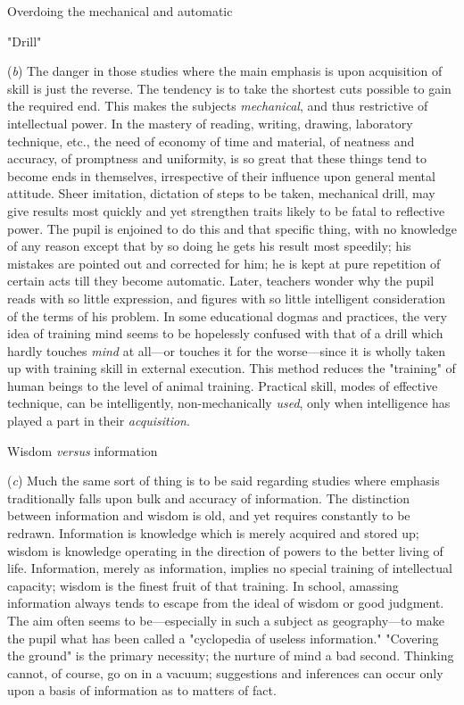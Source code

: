 \documentclass[letterpaper]{book}
\begin{document}
Overdoing the mechanical and automatic

"Drill"

(\emph{b}) The danger in those studies where the main emphasis is upon
acquisition of skill is just the reverse. The tendency is to take the
shortest cuts possible to gain the required end. This makes the subjects
\emph{mechanical}, and thus restrictive of intellectual power. In the
mastery of reading, writing, drawing, laboratory technique, etc., the
need of economy of time and material, of neatness and accuracy, of
promptness and uniformity, is so great that these things tend to become
ends in themselves, irrespective of their influence upon general mental
attitude. Sheer imitation, dictation of steps to be taken, mechanical
drill, may give results most quickly and yet strengthen traits likely to
be fatal to reflective power. The pupil is enjoined to do this and that
specific thing, with no knowledge of any reason except that by so doing
he gets his result most speedily; his mistakes are pointed out and
corrected for him; he is kept at pure repetition of certain acts till
they become automatic. Later, teachers wonder why the pupil reads with
so little expression, and figures with so little intelligent
consideration of the
terms
of his problem. In some educational dogmas and practices, the very idea
of training mind seems to be hopelessly confused with that of a drill
which hardly touches \emph{mind} at all---or touches it for the
worse---since it is wholly taken up with training skill in external
execution. This method reduces the "training" of human beings to the
level of animal training. Practical skill, modes of effective technique,
can be intelligently, non-mechanically \emph{used}, only when
intelligence has played a part in their \emph{acquisition}.

Wisdom \emph{versus} information

(\emph{c}) Much the same sort of thing is to be said regarding studies
where emphasis traditionally falls upon bulk and accuracy of
information. The distinction between information and wisdom is old, and
yet requires constantly to be redrawn. Information is knowledge which is
merely acquired and stored up; wisdom is knowledge operating in the
direction of powers to the better living of life. Information, merely as
information, implies no special training of intellectual capacity;
wisdom is the finest fruit of that training. In school, amassing
information always tends to escape from the ideal of wisdom or good
judgment. The aim often seems to be---especially in such a subject as
geography---to make the pupil what has been called a "cyclopedia of
useless information." "Covering the ground" is the primary necessity;
the nurture of mind a bad second. Thinking cannot, of course, go on in a
vacuum; suggestions and inferences can occur only upon a basis of
information as to matters of fact.
\end{document}

